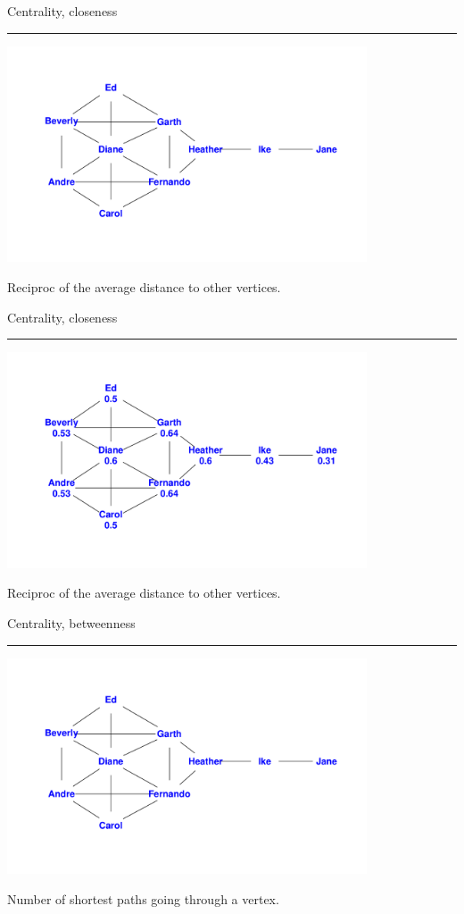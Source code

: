 \documentclass[landscape,fleqno]{foils}
\newcommand{\stitle}[1]{{\color{blue}\Large #1\par\vspace*{10pt}\hrule}}
\begin{document}
\newpage
\stitle{Centrality, closeness}
\begin{center}
\includegraphics[width=0.8\textwidth]{centnet}
\par Reciproc of the average distance to other vertices.
\end{center}

\newpage
\stitle{Centrality, closeness}
\begin{center}
\includegraphics[width=0.8\textwidth]{centnet-closeness}
\par Reciproc of the average distance to other vertices.
\end{center}

\newpage
\stitle{Centrality, betweenness}
\begin{center}
\includegraphics[width=0.8\textwidth]{centnet}
\par Number of shortest paths going through a vertex.
\end{center}
\end{document}
